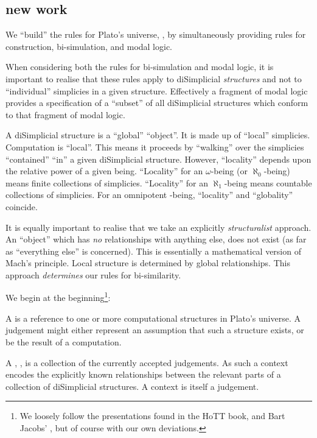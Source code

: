 \documentclass[a4paper,openany]{amsbook}
\begin{document}
\subsection{new work}

We ``build'' the rules for Plato's universe, \Universe{}{}, by simultaneously providing rules
for construction, bi-simulation, and modal logic.

When considering both the rules for bi-simulation and modal logic, it is important to
realise that these rules apply to diSimplicial \emph{structures} and not to ``individual''
simplicies in a given structure. Effectively a fragment of modal logic provides a
specification of a ``subset'' of all diSimplicial structures which conform to that
fragment of modal logic.

A diSimplicial structure is a ``global'' ``object''.  It is made up of ``local'' simplicies. 
Computation is ``local''. This means it proceeds by ``walking'' over the simplicies 
``contained'' ``in'' a given diSimplicial structure. However, ``locality'' depends upon the 
relative power of a given being. ``Locality'' for an $\omega$-being (or $\aleph_0$-being) 
means finite collections of simplicies. ``Locality'' for an $\aleph_1$-being means countable 
collections of simplicies. For an omnipotent \Cardinal-being, ``locality'' and ``globality'' 
coincide.

It is equally important to realise that we take an explicitly \emph{structuralist}
approach. An ``object'' which has \emph{no} relationships with anything else, does not
exist (as far as ``everything else'' is concerned). This is essentially a mathematical 
version of Mach's principle. Local structure is determined by global relationships.  This 
approach \emph{determines} our rules for bi-similarity.

We begin at the beginning\footnote{We loosely follow the presentations found in the HoTT
book, \cite[Appendix A2]{ufp2013hott} and Bart Jacobs' \cite{jacobs1999catLogicTypeTh},
but of course with our own deviations.}:

A  is a reference to one or more computational structures in Plato's
universe. A judgement might either represent an assumption that such a structure exists,
or be the result of a computation.

A , \cJudgement{\Gamma}, is a collection of the currently accepted
judgements. As such a context encodes the explicitly known relationships between the
relevant parts of a collection of diSimplicial structures. A context is itself a
judgement.
\end{document}
